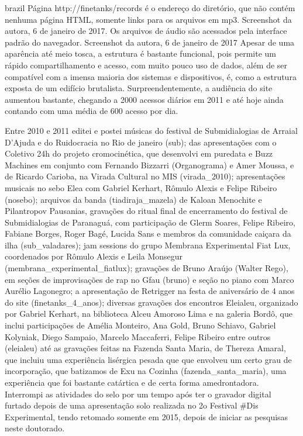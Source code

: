 \begin{otherlanguage*}{brazil}
Página http://finetanks/records é o endereço do diretório, que não contém nenhuma página HTML, somente links para os arquivos em mp3. Screenshot da autora, 6 de janeiro de 2017.
Os arquivos de áudio são acessados pela interface padrão do navegador. Screenshot da autora, 6 de janeiro de 2017
Apesar de uma aparência até meio tosca, a estrutura é bastante funcional, pois permite um rápido compartilhamento e acesso, com muito pouco uso de dados, além de ser compatível com a imensa maioria dos sistemas e dispositivos, é, como a estrutura exposta de um edifício brutalista. Surpreendentemente, a audiência do site aumentou bastante, chegando a 2000 acessos diários em 2011 e até hoje ainda contando com uma média de 600 acesso por dia.

Entre 2010 e 2011 editei e postei músicas do festival de Submidialogias de Arraial D'Ajuda e do Ruidocracia no Rio de janeiro (\/sub\/); das apresentações com o Coletivo 24h do projeto cromocinética, que desenvolvi em puredata e Buzz Machines em conjunto com Fernando Bizzarri (Organograma) e Amer Moussa, e de Ricardo Carioba, na Virada Cultural no MIS (virada\_2010\/); apresentações musicais no sebo Elea com Gabriel Kerhart, Rômulo Alexis e Felipe Ribeiro (nosebo\/); arquivos da banda (tiadiraja\_mazela\/) de Kaloan Menochite e Pilantropov Pausanias, gravações do ritual final de encerramento do festival de Submidialogias de Paranaguá, com participação de Glerm Soares, Felipe Ribeiro, Fabiane Borges, Roger Bagé, Lucida Sans e membros da comunidade caiçara da ilha (\/sub\_valadares\/); jam sessions do grupo Membrana Experimental Fiat Lux, coordenados por Rômulo Alexis e Leila Monsegur (membrana\_experimental\_fiatlux\/); gravações de Bruno Araújo (Walter Rego), em seções de improvisações de rap no Gfau (bruno\/) e seção no piano com Marco Aurélio Lagonegro; a apresentação de Retrigger na festa de aniversário de 4 anos do site (finetanks\_4\_anos\/); diversas gravações dos encontros Eleialeu, organizado por Gabriel Kerhart, na biblioteca Alceu Amoroso Lima e na galeria Bordô, que inclui participações de Amélia Monteiro, Ana Gold, Bruno Schiavo, Gabriel Kolyniak, Diego Sampaio, Marcelo Maccaferri, Felipe Ribeiro entre outros (\/eleialeu\/) até as gravações feitas na Fazenda Santa Maria, de Thereza Amaral, que incluiu uma experiência lisérgica pesada que que envolveu um certo grau de incorporação, que batizamos de Exu na Cozinha (\/fazenda\_santa\_maria\/), uma experiência que foi bastante catártica e de certa forma amedrontadora. 
Interrompi as atividades do selo por um tempo após ter o gravador digital furtado depois de uma apresentação solo realizada no 2o Festival \#Dis Experimental, tendo retomado somente em 2015, depois de iniciar as pesquisas neste doutorado. 


\end{otherlanguage*}
